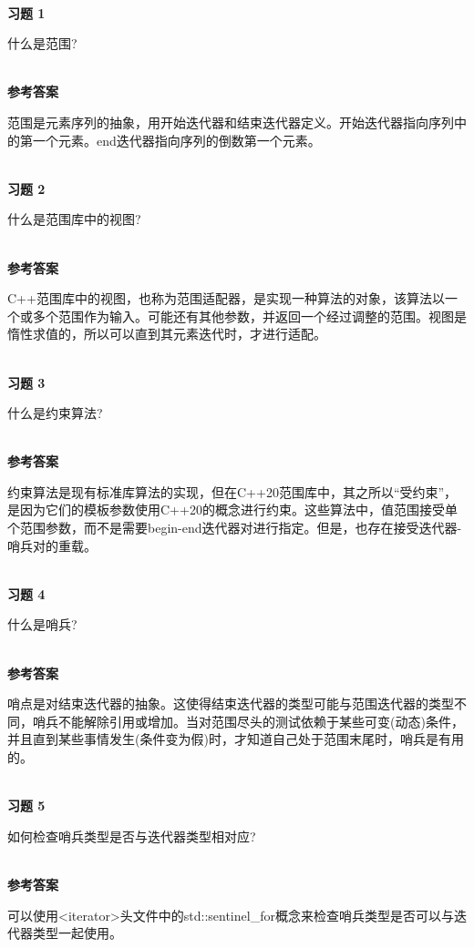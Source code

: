 \hspace*{\fill} \\ %
\noindent
\textbf{习题 1}

什么是范围?

\hspace*{\fill} \\ %
\noindent
\textbf{参考答案}

范围是元素序列的抽象，用开始迭代器和结束迭代器定义。开始迭代器指向序列中的第一个元素。end迭代器指向序列的倒数第一个元素。


\hspace*{\fill} \\ %
\noindent
\textbf{习题 2}

什么是范围库中的视图?

\hspace*{\fill} \\ %
\noindent
\textbf{参考答案}

C++范围库中的视图，也称为范围适配器，是实现一种算法的对象，该算法以一个或多个范围作为输入。可能还有其他参数，并返回一个经过调整的范围。视图是惰性求值的，所以可以直到其元素迭代时，才进行适配。

\hspace*{\fill} \\ %
\noindent
\textbf{习题 3}

什么是约束算法?

\hspace*{\fill} \\ %
\noindent
\textbf{参考答案}

约束算法是现有标准库算法的实现，但在C++20范围库中，其之所以“受约束”，是因为它们的模板参数使用C++20的概念进行约束。这些算法中，值范围接受单个范围参数，而不是需要begin-end迭代器对进行指定。但是，也存在接受迭代器-哨兵对的重载。

\hspace*{\fill} \\ %
\noindent
\textbf{习题 4}

什么是哨兵?

\hspace*{\fill} \\ %
\noindent
\textbf{参考答案}

哨点是对结束迭代器的抽象。这使得结束迭代器的类型可能与范围迭代器的类型不同，哨兵不能解除引用或增加。当对范围尽头的测试依赖于某些可变(动态)条件，并且直到某些事情发生(条件变为假)时，才知道自己处于范围末尾时，哨兵是有用的。

\hspace*{\fill} \\ %
\noindent
\textbf{习题 5}

如何检查哨兵类型是否与迭代器类型相对应?

\hspace*{\fill} \\ %
\noindent
\textbf{参考答案}

可以使用<iterator>头文件中的std::sentinel\_for概念来检查哨兵类型是否可以与迭代器类型一起使用。












